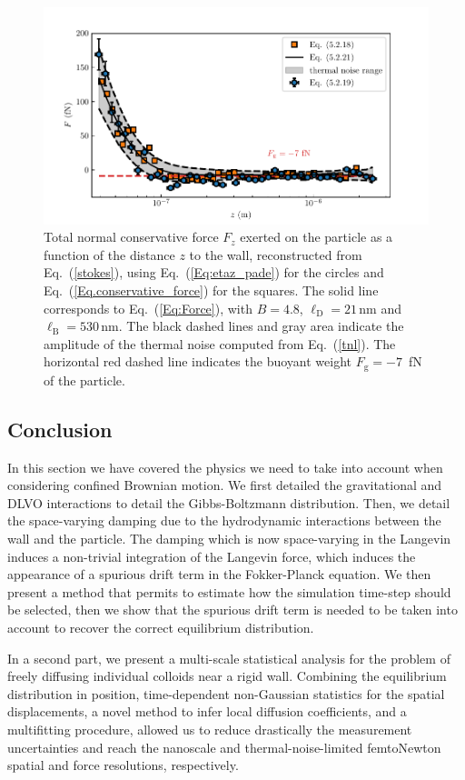 \begin{figure}[H]
	\centering
	\includegraphics{02_body/chapter3/images/trajctory_analysis/figure_force_total.pdf}
	\caption{Total normal conservative force $F_z$ exerted on the particle as a function of the distance $z$ to the wall, reconstructed from Eq.~(\ref{stokes}), using Eq.~(\ref{Eq:etaz_pade}) for the circles and Eq.~(\ref{Eq.conservative_force}) for the squares. The solid line corresponds to Eq.~(\ref{Eq:Force}), with $B=4.8$, $\ell_{\mathrm{D}}=21\,\mathrm{nm}$ and $\ell_{\mathrm{B}}=530\,\mathrm{nm}$. The black dashed lines and gray area indicate the amplitude of the thermal noise computed from Eq.~(\ref{tnl}). The horizontal red dashed line indicates the buoyant weight $F_{\textrm{g}}=-7$~fN of the particle.~\href{https://github.com/eXpensia/Confined-Brownian-Motion/blob/main/02_body/chapter3/images/trajctory_analysis/measure_force_experimental.ipynb}{\faGithub}}
	\label{fig.figure_force_total}
\end{figure}

\subsection{Conclusion}

In this section we have covered the physics we need to take into account when considering confined Brownian motion. We first detailed the gravitational and DLVO interactions to detail the Gibbs-Boltzmann distribution. Then, we detail the space-varying damping due to the hydrodynamic interactions between the wall and the particle. The damping which is now space-varying in the Langevin induces a non-trivial integration of the Langevin force, which induces the appearance of a spurious drift term in the Fokker-Planck equation. We then present a method that permits to estimate how the simulation time-step should be selected, then we show that the spurious drift term is needed to be taken into account to recover the correct equilibrium distribution.

In a second part, we present a multi-scale statistical analysis for the problem of freely diffusing individual colloids near a rigid wall. Combining the equilibrium distribution in position, time-dependent non-Gaussian statistics for the spatial displacements, a novel method to infer local diffusion coefficients, and a multifitting procedure, allowed us to reduce drastically the measurement uncertainties and reach the nanoscale and thermal-noise-limited femtoNewton spatial and force resolutions, respectively.



